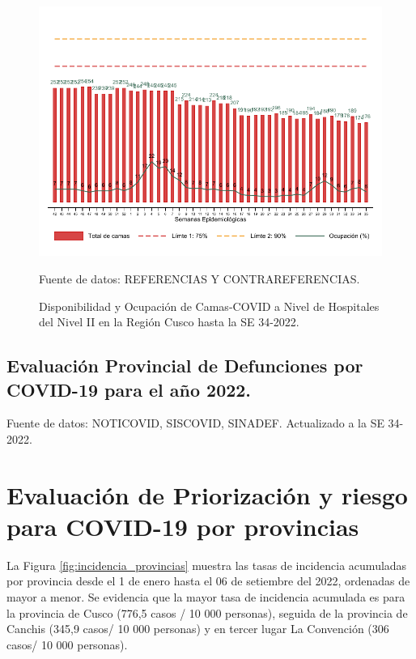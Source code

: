 \documentclass[12pt,a4paper,openany]{book}
\begin{document}
	\begin{figure}[h]
		\caption{Disponibilidad y Ocupación de Camas-COVID a Nivel de Hospitales del Nivel II en la Región Cusco hasta la SE 34-2022.}\label{fig:ocupacion_2nivel}
		\begin{center}
			\includegraphics[width=0.95\linewidth]{../figuras/nivel_2.pdf}
		\end{center}
		{\footnotesize {Fuente de datos: REFERENCIAS Y CONTRAREFERENCIAS.}}
	\end{figure}
	\clearpage
	\begin{landscape}
		
		\subsection*{Evaluación Provincial de Defunciones por COVID-19 para el año 2022.} 
		
		
		
		
		{\footnotesize Fuente de datos: NOTICOVID, SISCOVID, SINADEF. Actualizado a la SE 34-2022.}
		
		\noindent 
		
	\end{landscape}
	
	
	\clearpage
	
	\section*{Evaluación de Priorización y riesgo para COVID-19 por provincias}
	\noindent La Figura \ref{fig:incidencia_provincias} muestra las tasas de incidencia acumuladas por provincia desde el 1 de enero hasta el 06 de setiembre del 2022, ordenadas de mayor a menor. Se evidencia que la mayor tasa de incidencia acumulada es para la provincia de Cusco (776,5 casos / 10 000 personas), seguida de la provincia de Canchis (345,9 casos/ 10 000 personas) y en tercer lugar La Convención (306 casos/ 10 000 personas).
	
\end{document}
